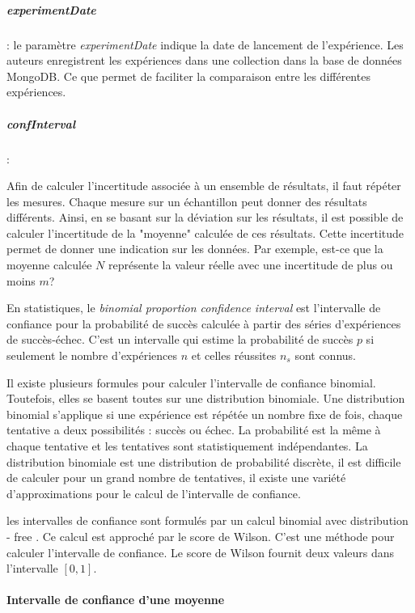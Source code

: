 \subparagraph{experimentDate} : le paramètre \textit{experimentDate} indique la date de lancement de l'expérience. Les auteurs enregistrent les expériences dans une collection dans la base de données MongoDB. Ce que permet de faciliter la comparaison entre les différentes expériences.

\subparagraph{confInterval} : 

\begin{tcolorbox}
	Afin de calculer l'incertitude associée à un ensemble de résultats, il faut répéter les mesures. Chaque mesure sur un échantillon peut donner des résultats différents. Ainsi, en se basant sur la déviation sur les résultats, il est possible de calculer l'incertitude de la "moyenne" calculée de ces résultats. Cette incertitude permet de donner une indication sur les données. Par exemple, est-ce que la moyenne calculée $N$ représente la valeur réelle avec une incertitude de plus ou moins  $m$?
\end{tcolorbox}
\begin{tcolorbox}
	   En statistiques, le \textit{binomial proportion confidence interval} est l'intervalle de confiance pour la probabilité de succès calculée à partir des séries d'expériences de succès-échec. C'est un intervalle qui estime la probabilité de succès $p$ si seulement le nombre d'expériences $n$ et celles réussites $n_s$ sont connus.
	   
	   Il existe plusieurs formules pour calculer l'intervalle de confiance binomial. Toutefois, elles se basent toutes sur une distribution binomiale.  Une distribution binomial s'applique si une expérience est répétée un nombre fixe de fois, chaque tentative a deux possibilités : succès ou échec. La probabilité est la même à chaque tentative et les tentatives sont statistiquement indépendantes. La distribution binomiale est une distribution de probabilité discrète, il est difficile de calculer pour un grand nombre de tentatives, il existe une variété d'approximations pour le calcul de l'intervalle de confiance.
	   
\end{tcolorbox}

les intervalles de confiance sont formulés par un calcul binomial avec distribution - free . Ce calcul  est approché par le score de Wilson. C'est une méthode pour calculer l'intervalle de confiance. Le score de Wilson fournit deux valeurs dans l'intervalle $ [0, 1]$. 


\paragraph{Intervalle de confiance d'une moyenne}~

